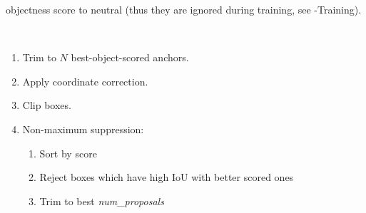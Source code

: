 \begin{frame}[t]
\begin{description}[<only@+>]
{      objectness score to neutral (thus they are ignored during
      training, see \cls{}-Training).
    }
  \item<only@+->[Proposal selection]~
    \begin{enumerate}[<+->]
    \item Trim to $N$ best-object-scored anchors.
    \item Apply coordinate correction.
    \item Clip boxes.
    \item Non-maximum suppression:
      \begin{enumerate}
      \item Sort by score
      \item Reject boxes which have high IoU with better scored ones
      \item Trim to best \emph{num\_proposals}
      \end{enumerate}
    \end{enumerate}
  \end{description}
\end{frame}

